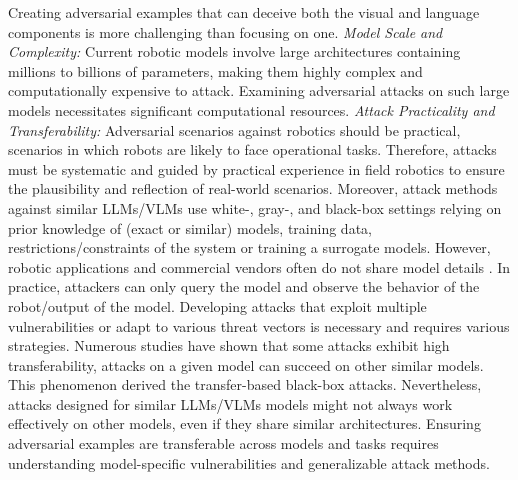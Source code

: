     Creating adversarial examples that can deceive both the visual and language components is more challenging than focusing on one. %
{} \emph{{Model Scale and Complexity:}} Current robotic models involve large architectures containing millions to billions of parameters, making them highly complex and computationally expensive to attack.
    Examining adversarial attacks on such large models necessitates significant computational resources. %
{} \emph{{Attack Practicality and Transferability:}} 
    Adversarial scenarios against robotics should be practical, \ie scenarios in which robots are likely to face operational tasks. 
Therefore, attacks must be systematic and guided by practical experience in field robotics to ensure the plausibility and reflection of real-world scenarios. 
    Moreover, attack methods against similar LLMs/VLMs use white-, gray-, and black-box settings relying on prior knowledge of (exact or similar) models, training data, restrictions/constraints of the system or training a surrogate models. However, robotic applications and commercial vendors often do not share model details \cite{cheng2018query}. In practice, attackers can only query the model and observe the behavior of the robot/output of the model. Developing attacks that exploit multiple vulnerabilities \cite{biggio2018wild} or adapt to various threat vectors is necessary and requires various strategies.
    Numerous studies have shown that some attacks exhibit high transferability, \ie attacks on a given model can succeed on other similar models. This phenomenon derived the transfer-based black-box attacks.
    Nevertheless, attacks designed for similar LLMs/VLMs models might not always work effectively on other models, even if they share similar architectures. 
    Ensuring adversarial examples are transferable \cite{liu2016delving} across models and tasks requires understanding model-specific vulnerabilities and generalizable attack methods.





